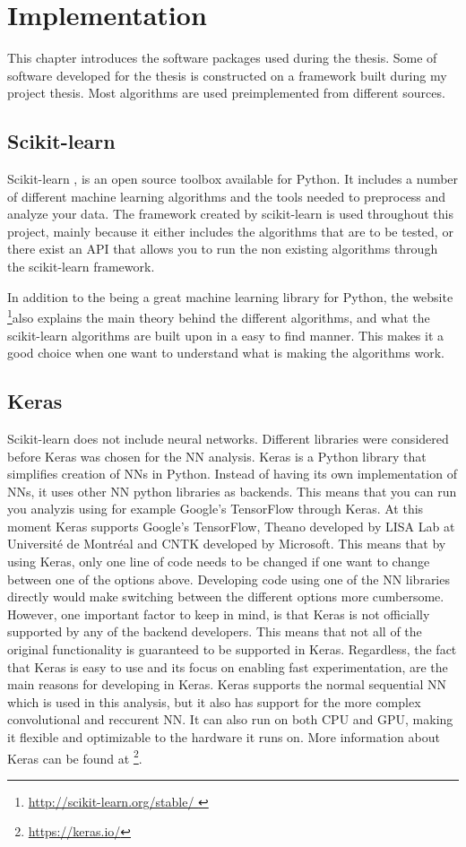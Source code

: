 \chapter{Implementation}\label{cha:contributions}
This chapter introduces the software packages used during the thesis. Some of software developed for the thesis is constructed on a framework built during my project thesis. Most algorithms are used preimplemented from different sources.   

\section{Scikit-learn}
Scikit-learn \cite{scikit-learn}, \cite{scikit-web} is an open source toolbox available for Python. It includes a number of different machine learning algorithms and the tools needed to preprocess and analyze your data. The framework created by scikit-learn is used throughout this project, mainly because it either includes the algorithms that are to be tested, or there exist an API that allows you to run the non existing algorithms through the scikit-learn framework. 

In addition to the being a great machine learning library for Python, the website \footnote{\url{http://scikit-learn.org/stable/ }}also explains the main theory behind the different algorithms, and what the scikit-learn algorithms are built upon in a easy to find manner. This makes it a good choice when one want to understand what is making the algorithms work.        

\section{Keras}
    Scikit-learn does not include neural networks. Different libraries were considered before Keras was chosen for the NN analysis. Keras \cite{chollet2015keras} is a Python library that simplifies creation of NNs in Python. Instead of having its own implementation of NNs, it uses other NN python libraries as backends. This means that you can run you analyzis using for example Google's TensorFlow through Keras. At this moment Keras supports Google's TensorFlow, Theano developed by LISA Lab at Université de Montréal and CNTK developed by Microsoft. This means that by using Keras, only one line of code needs to be changed if one want to change between one of the options above. Developing code using one of the NN libraries directly would make switching between the different options more cumbersome. However, one important factor to keep in mind, is that Keras is not officially supported by any of the backend developers. This means that  not all of the original functionality is guaranteed to be supported in Keras. Regardless, the fact that Keras is easy to use and its focus on enabling fast experimentation, are the main reasons for developing in Keras. Keras supports the normal sequential NN which is used in this analysis, but it also has support for the more complex convolutional and reccurent NN. It can also run on both CPU and GPU, making it flexible and optimizable to the hardware it runs on. More information about Keras can be found at \footnote{\url{https://keras.io/}}.
        
